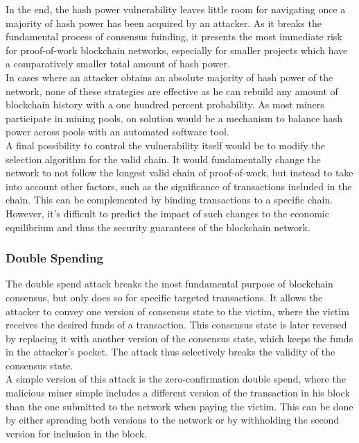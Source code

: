 \documentclass[12pt,a4paper]{article}
\begin{document}
In the end, the hash power vulnerability leaves little room for navigating once a majority of hash power has been acquired by an attacker. As it breaks the fundamental process of consensus fuinding, it presents the most immediate risk for proof-of-work blockchain networks, especially for smaller projects which have a comparatively smaller total amount of hash power.\\

In cases where an attacker obtains an absolute majority of hash power of the network, none of these strategies are effective as he can rebuild any amount of blockchain history with a one hundred percent probability. As most miners participate in mining pools, on solution would be a mechanism to balance hash power across pools with an automated software tool.\\

A final possibility to control the vulnerability itself would be to modify the selection algorithm for the valid chain. It would fundamentally change the network to not follow the longest valid chain of proof-of-work, but instead to take into account other factors, such as the significance of transactions included in the chain. This can be complemented by binding transactions to a specific chain. However, it's difficult to predict the impact of such changes to the economic equilibrium and thus the security guarantees of the blockchain network.\\

\subsubsection{Double Spending}

The double spend attack breaks the most fundamental purpose of blockchain consensus, but only does so for specific targeted transactions. It allows the attacker to convey one version of consensus state to the victim, where the victim receives the desired funds of a transaction. This consensus state is later reversed by replacing it with another version of the consensus state, which keeps the funds in the attacker's pocket. The attack thus selectively breaks the validity of the consensus state.\\

A simple version of this attack is the zero-confirmation double spend, where the malicious miner simple includes a different version of the transaction in his block than the one submitted to the network when paying the victim. This can be done by either spreading both versions to the network or by withholding the second version for inclusion in the block.\\
\end{document}
